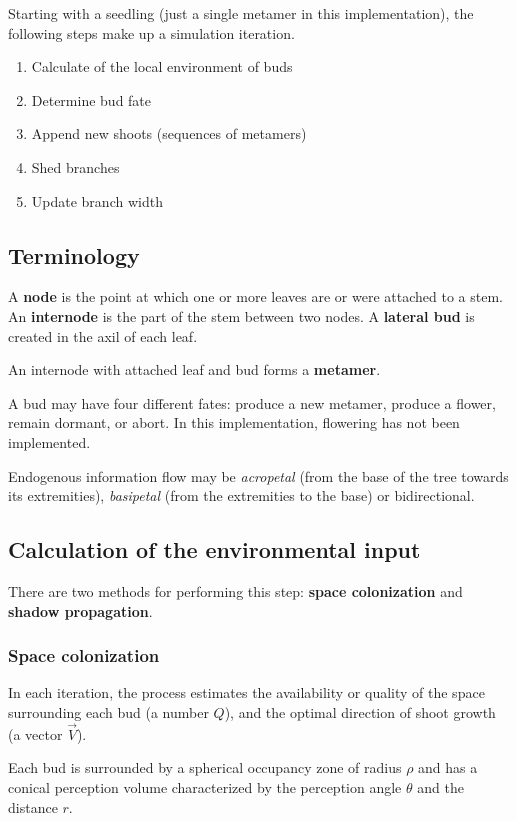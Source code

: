 \documentclass{article}
\begin{document}
Starting with a seedling (just a single metamer in this implementation), the following steps make up a simulation iteration.

\begin{enumerate}
\item Calculate of the local environment of buds
\item Determine bud fate
\item Append new shoots (sequences of metamers)
\item Shed branches
\item Update branch width
\end{enumerate}

\subsection{Terminology}

A \textbf{node} is the point at which one or more leaves are or were attached to a stem.
An \textbf{internode} is the part of the stem between two nodes.
A \textbf{lateral bud} is created in the axil of each leaf.

An internode with attached leaf and bud forms a \textbf{metamer}.

A bud may have four different fates: produce a new metamer, produce a flower, remain dormant, or abort.
In this implementation, flowering has not been implemented.

Endogenous information flow may be \textit{acropetal} (from the base of the tree towards its extremities), \textit{basipetal} (from the extremities to the base) or bidirectional.

\subsection{Calculation of the environmental input}

There are two methods for performing this step: \textbf{space colonization} and \textbf{shadow propagation}.

\subsubsection{Space colonization}

In each iteration, the process estimates the availability or quality of the space surrounding each bud (a number \(Q\)), and the optimal direction of shoot growth (a vector \(\vec{V}\)).

Each bud is surrounded by a spherical occupancy zone of radius \(\rho\) and has a conical perception volume characterized by the perception angle \(\theta\) and the distance \(r\).
\end{document}
